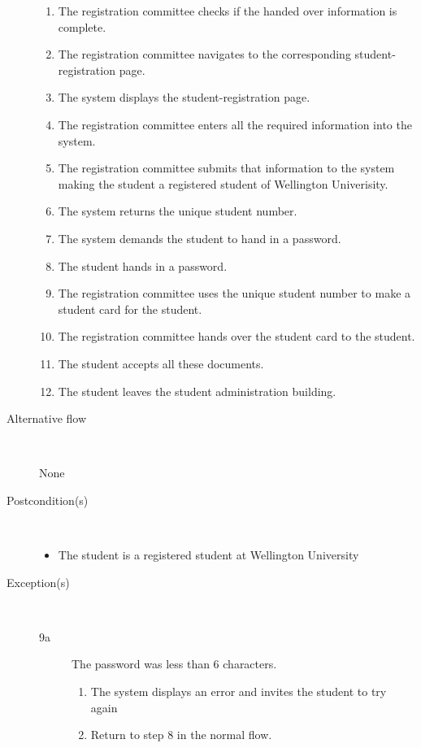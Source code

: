 \begin{description}
\begin{enumerate}
	  	\item The registration committee checks if the handed over information is
	  	complete.
	  	\item The registration committee navigates to the corresponding student-	  
	  	registration page.
	  	\item The system displays the student-registration page.
	  	\item The registration committee enters all the required information into
	  	the system.
	  	\item The registration committee submits that information to the system
	  	making the student a registered student of Wellington Univerisity.
	  	\item The system returns the unique student number.
	  	\item The system demands the student to hand in a password. 
	  	\item The student hands in a password.
	  	\item The registration committee uses the unique student number to make a
	  	student card for the student.
	  	\item The registration committee hands over the student card to the student.
	  	\item The student accepts all these documents.
	  	\item The student leaves the student administration building.
	\end{enumerate}
	\item[Alternative flow] \
		\par None
	\item[Postcondition(s)] \ 
	\begin{itemize}
		\item The student is a registered student at Wellington University
	\end{itemize}
	\item[Exception(s)] \ 
		\begin{description}
			\item[9a] The password was less than 6 characters.
			\begin{enumerate}
			  \item The system displays an error and invites the student to try again
			  \item Return to step 8 in the normal flow.
			\end{enumerate}
		\end{description}
			
\end{description}

